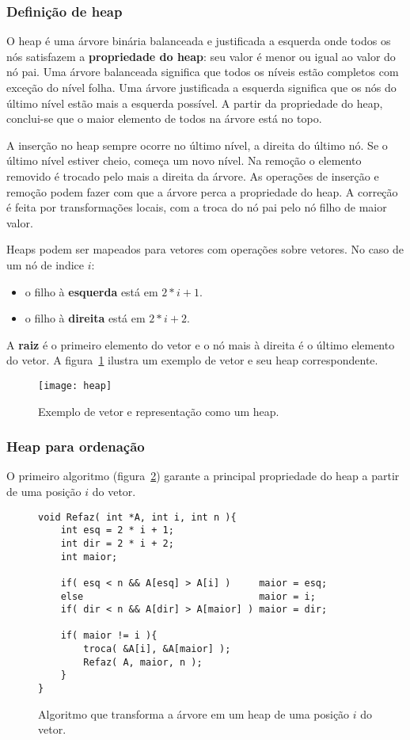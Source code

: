\subsubsection*{Definição de heap}

O heap é uma árvore binária balanceada e justificada a esquerda onde todos os
nós satisfazem a {\bf propriedade do heap}: seu valor é menor ou igual ao valor
do nó pai.
Uma árvore balanceada significa que todos os níveis estão completos com exceção
do nível folha.
Uma árvore justificada a esquerda significa que os nós do último nível
estão mais a esquerda possível.
A partir da propriedade do heap, conclui-se que o maior elemento de todos
na árvore está no topo.

A inserção no heap sempre ocorre no último nível, a direita do último nó.
Se o último nível estiver cheio, começa um novo nível. 
Na remoção o elemento removido é trocado pelo mais a direita da árvore.
As operações de inserção e remoção podem fazer com que a árvore perca a
propriedade do heap.  A correção é feita por transformações locais, com a troca
do nó pai pelo nó filho de maior valor.

Heaps podem ser mapeados para vetores com operações sobre vetores.
No caso de um nó de indice $i$:
\begin{itemize}
\item o filho à {\bf esquerda} está em $2*i+1$.
\item o filho à {\bf direita} está em $2*i+2$.
\end{itemize}
A {\bf raiz} é o primeiro elemento do vetor e o nó mais à direita é o último
elemento do vetor.
A figura~\ref{aula03:fig:heap} ilustra um exemplo de vetor e seu heap correspondente.
%
\begin{figure}[ht]
\centering
\texttt{[image: heap]}
\caption{Exemplo de vetor e representação como um heap.}
\label{aula03:fig:heap}
\end{figure}

\subsubsection*{Heap para ordenação}

O primeiro algoritmo (figura~\ref{aula03:algo:heap:refaz}) garante a principal
propriedade do heap a partir de uma posição $i$ do vetor.
%
\begin{figure}[!htb]
\centering
\begin{framed}
\begin{lstlisting}
void Refaz( int *A, int i, int n ){
	int esq = 2 * i + 1;
	int dir = 2 * i + 2;
	int maior;

	if( esq < n && A[esq] > A[i] )     maior = esq;
	else                               maior = i;
	if( dir < n && A[dir] > A[maior] ) maior = dir;

	if( maior != i ){
		troca( &A[i], &A[maior] );
		Refaz( A, maior, n );
	}
}
\end{lstlisting}
\end{framed}
\caption{Algoritmo que transforma a árvore em um heap de uma posição $i$ do vetor.}
\label{aula03:algo:heap:refaz}
\end{figure}

